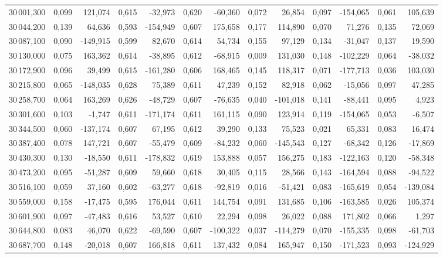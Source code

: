 \begin{longtable}{rrrrrrrrrrrrr}
30\,001,300 & 0,099 & 121,074 & 0,615 & -32,973 & 0,620 & -60,360 & 0,072 & 26,854 & 0,097 & -154,065 & 0,061 & 105,639\\
30\,044,200 & 0,139 & 64,636 & 0,593 & -154,949 & 0,607 & 175,658 & 0,177 & 114,890 & 0,070 & 71,276 & 0,135 & 72,069\\
30\,087,100 & 0,090 & -149,915 & 0,599 & 82,670 & 0,614 & 54,734 & 0,155 & 97,129 & 0,134 & -31,047 & 0,137 & 19,590\\
30\,130,000 & 0,075 & 163,362 & 0,614 & -38,895 & 0,612 & -68,915 & 0,009 & 131,030 & 0,148 & -102,229 & 0,064 & -38,032\\
30\,172,900 & 0,096 & 39,499 & 0,615 & -161,280 & 0,606 & 168,465 & 0,145 & 118,317 & 0,071 & -177,713 & 0,036 & 103,030\\
30\,215,800 & 0,065 & -148,035 & 0,628 & 75,389 & 0,611 & 47,239 & 0,152 & 82,918 & 0,062 & -15,056 & 0,097 & 47,285\\
30\,258,700 & 0,064 & 163,269 & 0,626 & -48,729 & 0,607 & -76,635 & 0,040 & -101,018 & 0,141 & -88,441 & 0,095 & 4,923\\
30\,301,600 & 0,103 & -1,747 & 0,611 & -171,174 & 0,611 & 161,115 & 0,090 & 123,914 & 0,119 & -154,065 & 0,053 & -6,507\\
30\,344,500 & 0,060 & -137,174 & 0,607 & 67,195 & 0,612 & 39,290 & 0,133 & 75,523 & 0,021 & 65,331 & 0,083 & 16,474\\
30\,387,400 & 0,078 & 147,721 & 0,607 & -55,479 & 0,609 & -84,232 & 0,060 & -145,543 & 0,127 & -68,342 & 0,126 & -17,869\\
30\,430,300 & 0,130 & -18,550 & 0,611 & -178,832 & 0,619 & 153,888 & 0,057 & 156,275 & 0,183 & -122,163 & 0,120 & -58,348\\
30\,473,200 & 0,095 & -51,287 & 0,609 & 59,660 & 0,618 & 30,405 & 0,115 & 28,566 & 0,143 & -164,594 & 0,088 & -94,522\\
30\,516,100 & 0,059 & 37,160 & 0,602 & -63,277 & 0,618 & -92,819 & 0,016 & -51,421 & 0,083 & -165,619 & 0,054 & -139,084\\
30\,559,000 & 0,158 & -17,475 & 0,595 & 176,044 & 0,611 & 144,754 & 0,091 & 131,685 & 0,106 & -163,585 & 0,026 & 105,374\\
30\,601,900 & 0,097 & -47,483 & 0,616 & 53,527 & 0,610 & 22,294 & 0,098 & 26,022 & 0,088 & 171,802 & 0,066 & 1,297\\
30\,644,800 & 0,083 & 46,070 & 0,622 & -69,590 & 0,607 & -100,322 & 0,037 & -114,279 & 0,070 & -155,335 & 0,098 & -61,703\\
30\,687,700 & 0,148 & -20,018 & 0,607 & 166,818 & 0,611 & 137,432 & 0,084 & 165,947 & 0,150 & -171,523 & 0,093 & -124,929\\

\end{longtable}
